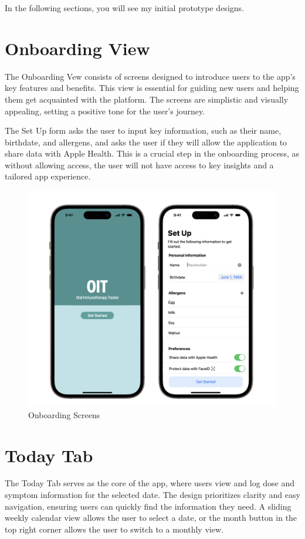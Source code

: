 In the following sections, you will see my initial prototype designs.

\section{Onboarding View}

The Onboarding Vew consists of screens designed to introduce users to the app's key features and benefits. This view is essential for guiding new users and helping them get acquainted with the platform. The screens are simplistic and visually appealing, setting a positive tone for the user's journey.

The Set Up form asks the user to input key information, such as their name, birthdate, and allergens, and asks the user if they will allow the application to share data with Apple Health. This is a crucial step in the onboarding process, as without allowing access, the user will not have access to key insights and a tailored app experience.

\begin{figure}[H]
    \centering
    \includegraphics[width=0.5\linewidth]{thesis//chapters//images/onboarding-screens.png}
    \caption{Onboarding Screens}
    \label{fig:onboarding-screens}
\end{figure}

\section{Today Tab}

The Today Tab serves as the core of the app, where users view and log dose and symptom information for the selected date. The design prioritizes clarity and easy navigation, ensuring users can quickly find the information they need. A sliding weekly calendar view allows the user to select a date, or the month button in the top right corner allows the user to switch to a monthly view. 

